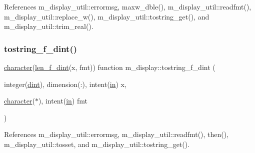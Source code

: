 References m\+\_\+display\+\_\+util\+::errormsg, maxw\+\_\+dble(), m\+\_\+display\+\_\+util\+::readfmt(), m\+\_\+display\+\_\+util\+::replace\+\_\+w(), m\+\_\+display\+\_\+util\+::tostring\+\_\+get(), and m\+\_\+display\+\_\+util\+::trim\+\_\+real().

\mbox{\label{namespacem__display_ac1dd519655fda1c495ba40efe16fbc0b}} 
\subsubsection{\texorpdfstring{tostring\+\_\+f\+\_\+dint()}{tostring\_f\_dint()}}
{\footnotesize\ttfamily \hyperlink{option__stopwatch_83_8txt_abd4b21fbbd175834027b5224bfe97e66}{character}(\hyperlink{namespacem__display_a6a2709cf5f243ee492f223b40c6b5143}{len\+\_\+f\+\_\+dint}(x, fmt)) function m\+\_\+display\+::tostring\+\_\+f\+\_\+dint (\begin{DoxyParamCaption}\item[{integer(\hyperlink{namespacem__display_a73f772e9702cad6f40b78364fde2c7cd}{dint}), dimension(\+:), intent(\hyperlink{M__journal_83_8txt_afce72651d1eed785a2132bee863b2f38}{in})}]{x,  }\item[{\hyperlink{option__stopwatch_83_8txt_abd4b21fbbd175834027b5224bfe97e66}{character}($\ast$), intent(\hyperlink{M__journal_83_8txt_afce72651d1eed785a2132bee863b2f38}{in})}]{fmt }\end{DoxyParamCaption})\hspace{0.3cm}{\ttfamily [private]}}



References m\+\_\+display\+\_\+util\+::errormsg, m\+\_\+display\+\_\+util\+::readfmt(), then(), m\+\_\+display\+\_\+util\+::tosset, and m\+\_\+display\+\_\+util\+::tostring\+\_\+get().

\mbox{\label{namespacem__display_aa23f6d3ab75d3383a0e95a4582cedc87}} 
